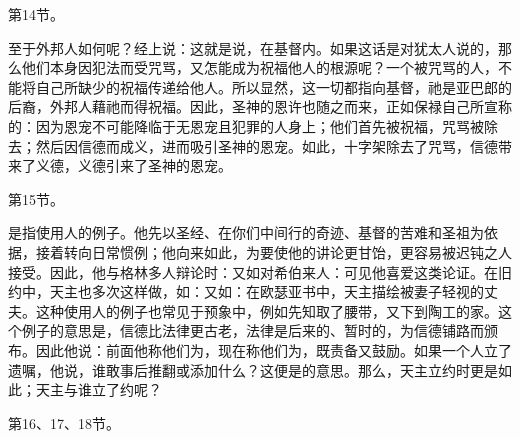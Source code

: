 第14节。\par

至于外邦人如何呢？经上说：这就是说，在基督内。如果这话是对犹太人说的，那么他们本身因犯法而受咒骂，又怎能成为祝福他人的根源呢？一个被咒骂的人，不能将自己所缺少的祝福传递给他人。所以显然，这一切都指向基督，祂是亚巴郎的后裔，外邦人藉祂而得祝福。因此，圣神的恩许也随之而来，正如保禄自己所宣称的：因为恩宠不可能降临于无恩宠且犯罪的人身上；他们首先被祝福，咒骂被除去；然后因信德而成义，进而吸引圣神的恩宠。如此，十字架除去了咒骂，信德带来了义德，义德引来了圣神的恩宠。\par

第15节。\par

是指使用人的例子。他先以圣经、在你们中间行的奇迹、基督的苦难和圣祖为依据，接着转向日常惯例；他向来如此，为要使他的讲论更甘饴，更容易被迟钝之人接受。因此，他与格林多人辩论时：又如对希伯来人：可见他喜爱这类论证。在旧约中，天主也多次这样做，如：又如：在欧瑟亚书中，天主描绘被妻子轻视的丈夫。这种使用人的例子也常见于预象中，例如先知取了腰带，又下到陶工的家。这个例子的意思是，信德比法律更古老，法律是后来的、暂时的，为信德铺路而颁布。因此他说：前面他称他们为，现在称他们为，既责备又鼓励。如果一个人立了遗嘱，他说，谁敢事后推翻或添加什么？这便是的意思。那么，天主立约时更是如此；天主与谁立了约呢？\par

第16、17、18节。\par

